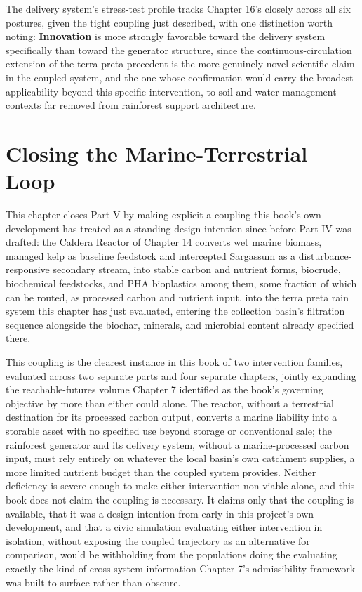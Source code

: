\documentclass[11pt,oneside]{book}
\begin{document}
The delivery system's stress-test profile tracks Chapter 16's closely across all six postures, given the tight coupling just described, with one distinction worth noting: \textbf{Innovation} is more strongly favorable toward the delivery system specifically than toward the generator structure, since the continuous-circulation extension of the terra preta precedent is the more genuinely novel scientific claim in the coupled system, and the one whose confirmation would carry the broadest applicability beyond this specific intervention, to soil and water management contexts far removed from rainforest support architecture.

\section*{Closing the Marine-Terrestrial Loop}

This chapter closes Part V by making explicit a coupling this book's own development has treated as a standing design intention since before Part IV was drafted: the Caldera Reactor of Chapter 14 converts wet marine biomass, managed kelp as baseline feedstock and intercepted Sargassum as a disturbance-responsive secondary stream, into stable carbon and nutrient forms, biocrude, biochemical feedstocks, and PHA bioplastics among them, some fraction of which can be routed, as processed carbon and nutrient input, into the terra preta rain system this chapter has just evaluated, entering the collection basin's filtration sequence alongside the biochar, minerals, and microbial content already specified there.

This coupling is the clearest instance in this book of two intervention families, evaluated across two separate parts and four separate chapters, jointly expanding the reachable-futures volume Chapter 7 identified as the book's governing objective by more than either could alone. The reactor, without a terrestrial destination for its processed carbon output, converts a marine liability into a storable asset with no specified use beyond storage or conventional sale; the rainforest generator and its delivery system, without a marine-processed carbon input, must rely entirely on whatever the local basin's own catchment supplies, a more limited nutrient budget than the coupled system provides. Neither deficiency is severe enough to make either intervention non-viable alone, and this book does not claim the coupling is necessary. It claims only that the coupling is available, that it was a design intention from early in this project's own development, and that a civic simulation evaluating either intervention in isolation, without exposing the coupled trajectory as an alternative for comparison, would be withholding from the populations doing the evaluating exactly the kind of cross-system information Chapter 7's admissibility framework was built to surface rather than obscure.
\end{document}
